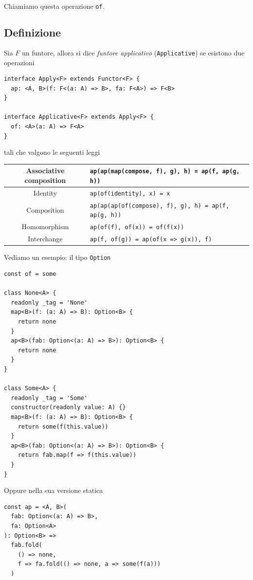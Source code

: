\documentclass[12pt]{article}
\begin{document}
Chiamiamo questa operazione \texttt{of}.

\subsection{Definizione}

Sia $F$ un funtore, allora si dice \emph{funtore applicativo} (\texttt{Applicative}) se esistono due operazioni

\begin{verbatim}
interface Apply<F> extends Functor<F> {
  ap: <A, B>(f: F<(a: A) => B>, fa: F<A>) => F<B>
}

interface Applicative<F> extends Apply<F> {
  of: <A>(a: A) => F<A>
}
\end{verbatim}

tali che valgono le seguenti leggi

\begin{center}
\bgroup
\def\arraystretch{1.5}
\begin{tabular}{ |c|p{10cm}| }
\hline
Associative composition & \texttt{ap(ap(map(compose, f), g), h) = ap(f, ap(g, h))} \\
\hline
Identity & \texttt{ap(of(identity), x) = x} \\
\hline
Composition & \texttt{ap(ap(ap(of(compose), f), g), h) = ap(f, ap(g, h))} \\
\hline
Homomorphism & \texttt{ap(of(f), of(x)) = of(f(x))} \\
\hline
Interchange & \texttt{ap(f, of(g)) = ap(of(x => g(x)), f)} \\
\hline
\end{tabular}
\egroup
\end{center}

Vediamo un esempio: il tipo \texttt{Option}

\begin{verbatim}
const of = some

class None<A> {
  readonly _tag = 'None'
  map<B>(f: (a: A) => B): Option<B> {
    return none
  }
  ap<B>(fab: Option<(a: A) => B>): Option<B> {
    return none
  }
}

class Some<A> {
  readonly _tag = 'Some'
  constructor(readonly value: A) {}
  map<B>(f: (a: A) => B): Option<B> {
    return some(f(this.value))
  }
  ap<B>(fab: Option<(a: A) => B>): Option<B> {
    return fab.map(f => f(this.value))
  }
}
\end{verbatim}

Oppure nella sua versione statica

\begin{verbatim}
const ap = <A, B>(
  fab: Option<(a: A) => B>,
  fa: Option<A>
): Option<B> =>
  fab.fold(
    () => none,
    f => fa.fold(() => none, a => some(f(a)))
  )
\end{verbatim}
\end{document}
